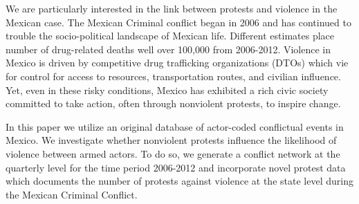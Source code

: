 We are particularly interested in the link between protests and violence in the Mexican case. The Mexican Criminal conflict began in 2006 and has continued to trouble the socio-political landscape of Mexican life. Different estimates place number of drug-related deaths well over 100,000 from 2006-2012. Violence in Mexico is driven by competitive drug trafficking organizations (DTOs) which vie for control for access to resources, transportation routes, and civilian influence. Yet, even in these risky conditions, Mexico has exhibited a rich civic society committed to take action, often through nonviolent protests, to inspire change.

In this paper we utilize an original database of actor-coded conflictual events in Mexico. We investigate whether nonviolent protests influence the likelihood of violence between armed actors. To do so, we generate a conflict network at the quarterly level for the time period 2006-2012 and incorporate novel protest data which documents the number of protests against violence at the state level during the Mexican Criminal Conflict. 